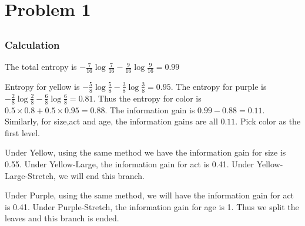 

\oddsidemargin 0in
\evensidemargin 0in
\textwidth 6.5in
\topmargin -0.5in
\textheight 9.0in




\pagestyle{myheadings}  %

\section{Problem 1}
\subsection{}
\subsubsection{Calculation}
\noindent The total entropy is $-\frac{7}{16}\log{\frac{7}{16}}-\frac{9}{16}\log{\frac{9}{16}}=0.99$

\noindent Entropy for yellow is $-\frac{5}{8}\log{\frac{5}{8}}-\frac{3}{8}\log{\frac{3}{8}}=0.95$. The entropy for purple is $-\frac{2}{8}\log{\frac{2}{8}}-\frac{6}{8}\log{\frac{6}{8}}=0.81$.  Thus the entropy for color is $0.5\times0.8+0.5\times0.95=0.88$. The information gain is $0.99-0.88=0.11$. Similarly, for size,act and age, the information gains are all $0.11$. Pick color as the first level. 

\noindent Under Yellow, using the same method we have the information gain for size is 0.55. Under Yellow-Large, the information gain for act is 0.41. Under Yellow-Large-Stretch, we will end this branch. 

\noindent Under Purple, using the same method, we will have the information gain for act is 0.41. Under Purple-Stretch, the information gain for age is 1. Thus we split the leaves and this branch is ended.
